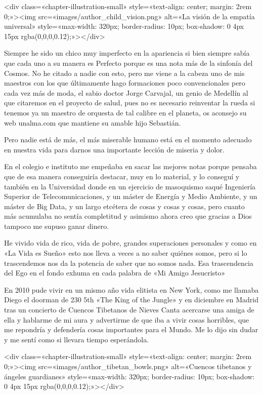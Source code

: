 \documentclass[12pt,twoside,openany]{book}
\begin{document}
<div class=«chapter-illustration-small» style=«text-align: center; margin: 2rem 0;»><img src=«images/author_child_vision.png» alt=«La visión de la empatía universal» style=«max-width: 320px; border-radius: 10px; box-shadow: 0 4px 15px rgba(0,0,0,0.12);»></div>

Siempre he sido un chico muy imperfecto en la apariencia si bien siempre sabía que cada uno a su manera es Perfecto porque es una nota más de la sinfonía del Cosmos. No he citado a nadie con esto, pero me viene a la cabeza uno de mis maestros con los que últimamente hago formaciones poco convencionales pero cada vez más de moda, el sabio doctor Jorge Carvajal, un genio de Medellín al que citaremos en el proyecto de salud, pues no es necesario reinventar la rueda si tenemos ya un maestro de orquesta de tal calibre en el planeta, os aconsejo su web unalma.com que mantiene su amable hijo Sebastián. 

Pero nadie está de más, el más miserable humano está en el momento adecuado en nuestra vida para darnos una importante lección de miseria y dolor. 

En el colegio e instituto me empeñaba en sacar las mejores notas porque pensaba que de esa manera conseguiría destacar, muy en lo material, y lo conseguí y también en la Universidad donde en un ejercicio de masoquismo saqué Ingeniería Superior de Telecomunicaciones, y un máster de Energía y Medio Ambiente, y un máster de Big Data, y un largo etcétera de cosas y cosas y cosas, pero cuanto más acumulaba no sentía completitud y asimismo ahora creo que gracias a Dios tampoco me supuso ganar dinero.

He vivido vida de rico, vida de pobre, grandes superaciones personales y como en «La Vida es Sueño» esto nos lleva a veces a no saber quiénes somos, pero si lo trascendemos nos da la potencia de saber que no somos nada. Esa trascendencia del Ego en el fondo exhuma en cada palabra de «Mi Amigo Jesucristo»

En 2010 pude vivir en un mismo año vida elitista en New York, como me llamaba Diego el doorman de 230 5th «The King of the Jungle» y en diciembre en Madrid tras un concierto de Cuencos Tibetanos de Nieves Canta acercarse una amiga de ella y hablarme de mi aura y advertirme de que iba a vivir cosas horribles, que me repondría y defendería cosas importantes para el Mundo. Me lo dijo sin dudar y me sentí como si llevara tiempo esperándola. 

<div class=«chapter-illustration-small» style=«text-align: center; margin: 2rem 0;»><img src=«images/author_tibetan_bowls.png» alt=«Cuencos tibetanos y ángeles guardianes» style=«max-width: 320px; border-radius: 10px; box-shadow: 0 4px 15px rgba(0,0,0,0.12);»></div>
\end{document}
